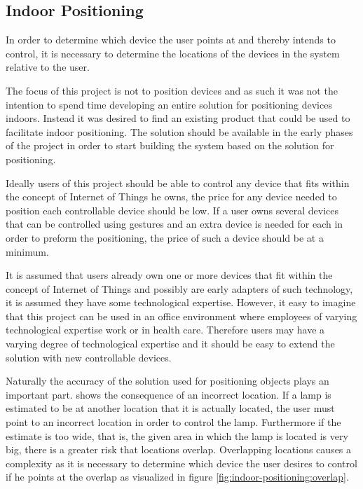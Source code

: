 \subsection{Indoor Positioning}\label{sec:indoor-positioning}
In order to determine which device the user points at and thereby intends to control, 
it is necessary to determine the locations of the devices in the system relative to the user.

The focus of this project is not to position devices and as such it was not the intention to spend time developing an entire solution for positioning devices indoors. 
Instead it was desired to find an existing product that could be used to facilitate indoor positioning.
The solution should be available in the early phases of the project in order to start building the system based on the solution for positioning.

Ideally users of this project should be able to control any device that fits within the concept of Internet of Things he owns, 
the price for any device needed to position each controllable device should be low. 
If a user owns several devices that can be controlled using gestures and an extra device is needed for each in order to preform the positioning, 
the price of such a device should be at a minimum.

It is assumed that users already own one or more devices that fit within the concept of Internet of Things and possibly are early adapters of such technology, 
it is assumed they have some technological expertise. 
However, it easy to imagine that this project can be used in an office environment where employees of varying technological expertise work or in health care. 
Therefore users may have a varying degree of technological expertise and it should be easy to extend the solution with new controllable devices.

Naturally the accuracy of the solution used for positioning objects plays an important part. 
 shows the consequence of an incorrect location. 
If a lamp is estimated to be at another location that it is actually located, 
the user must point to an incorrect location in order to control the lamp.
Furthermore if the estimate is too wide, that is, the given area in which the lamp is located is very big, 
there is a greater risk that locations overlap. 
Overlapping locations causes a complexity as it is necessary to determine which device the user desires to control if he points at the overlap as visualized in figure \ref{fig:indoor-positioning:overlap}.

